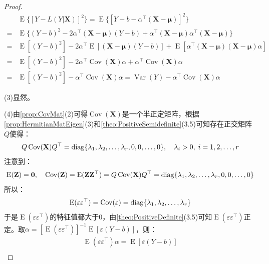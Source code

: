 \begin{proof}
	\begin{align*}
		&\operatorname{E}\{[Y-L(Y|\mathbf{X})]^2\}=\operatorname{E}\{[Y-b-\alpha^{\top}(\mathbf{X}-\boldsymbol{\mu})]^2\} \\
		=&\operatorname{E}\{(Y-b)^2-2\alpha^{\top}(\mathbf{X}-\boldsymbol{\mu})(Y-b)+\alpha^{\top}(\mathbf{X}-\boldsymbol{\mu})\alpha^{\top}(\mathbf{X}-\boldsymbol{\mu})\} \\
		=&\operatorname{E}[(Y-b)^2]-2\alpha^{\top}\operatorname{E}[(\mathbf{X}-\boldsymbol{\mu})(Y-b)]+\operatorname{E}[\alpha^{\top}(\mathbf{X}-\boldsymbol{\mu})(\mathbf{X}-\boldsymbol{\mu})\alpha] \\
		=&\operatorname{E}[(Y-b)^2]-2\alpha^{\top}\operatorname{Cov}(\mathbf{X})\alpha+\alpha^{\top}\operatorname{Cov}(\mathbf{X})\alpha \\
		=&\operatorname{E}[(Y-b)^2]-\alpha^{\top}\operatorname{Cov}(\mathbf{X})\alpha=\operatorname{Var}(Y)-\alpha^{\top}\operatorname{Cov}(\mathbf{X})\alpha
	\end{align*}\par
	(3)显然。\par
	(4)由\cref{prop:CovMat}(2)可得$\operatorname{Cov}(\mathbf{X})$是一个半正定矩阵，根据\cref{prop:HermitianMatEigen}(3)和\cref{theo:PositiveSemidefinite}(3.5)可知存在正交矩阵$Q$使得：
	\begin{equation*}
		Q\operatorname{Cov}(\mathbf{X})Q^{\top}=\operatorname{diag}\{\lambda_1, \lambda_2, \dots, \lambda_{r},0,0,\dots,0\},\quad\lambda_i>0,\;i=1,2,\dots,r
	\end{equation*}
	注意到：
	\begin{equation*}
		\operatorname{E}(\mathbf{Z})=\mathbf{0},\quad\operatorname{Cov}(\mathbf{Z})=\operatorname{E}(\mathbf{Z}\mathbf{Z}^{\top})=Q\operatorname{Cov}(\mathbf{X})Q^{\top}=\operatorname{diag}\{\lambda_1, \lambda_2, \dots, \lambda_{r},0,0,\dots,0\}
	\end{equation*}
	所以：
	\begin{equation*}
		\operatorname{E}(\varepsilon\varepsilon^{\top})=\operatorname{Cov}(\varepsilon)=\operatorname{diag}\{\lambda_1, \lambda_2, \dots, \lambda_{r}\}
	\end{equation*}
	于是$\operatorname{E}(\varepsilon\varepsilon^{\top})$的特征值都大于$0$，由\cref{theo:PositiveDefinite}(3.5)可知$\operatorname{E}(\varepsilon\varepsilon^{\top})$正定。取$\alpha=[\operatorname{E}(\varepsilon\varepsilon^{\top})]^{-1}\operatorname{E}[\varepsilon(Y-b)]$，则：
	\begin{gather*}
		\operatorname{E}(\varepsilon\varepsilon^{\top})\alpha=\operatorname{E}[\varepsilon(Y-b)] \\

\end{gather*}
\end{proof}
